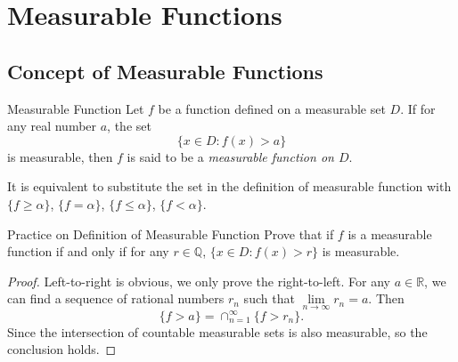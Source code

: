 

\section{Measurable Functions}

\subsection{Concept of Measurable Functions}

\begin{definition}{Measurable Function}{}
  Let $f$ be a function defined on a measurable set $D$.
  If for any real number $a$, the set
  \begin{equation}
    \{x \in D: f(x) > a\}
  \end{equation}
  is measurable, then $f$ is said to be a \emph{measurable function on $D$}.
\end{definition}

\begin{note}
  It is equivalent to substitute the set in the definition of measurable function with
  $\{f \geq \alpha\}$, $\{f = \alpha\}$, $\{f \leq \alpha\}$, $\{f < \alpha\}$.
\end{note}

\begin{example}{Practice on Definition of Measurable Function}{}
  Prove that if $f$ is a measurable function if and only if for any $r \in
    \mathbb{Q}$, $\{x \in D: f(x) > r\}$ is measurable.
\end{example}

\begin{proof}
  Left-to-right is obvious, we only prove the right-to-left.
  For any $a \in \mathbb{R}$, we can find a sequence of rational numbers $r_n$
  such that $\lim \limits _{n \rightarrow \infty} r_n = a$.
  Then
  \begin{equation}
    \{f > a\} = \cap _{n=1}^{\infty} \{f > r_n\}.
  \end{equation}
  Since the intersection of countable measurable sets is also measurable,
  so the conclusion holds.
\end{proof}

